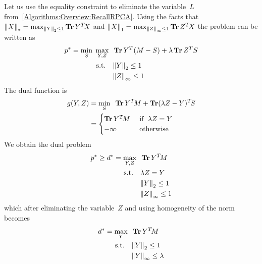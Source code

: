 \documentclass{../../common/projectreport}
\begin{document}
Let us use the equality constraint to eliminate the variable~$L$ from~\eqref{Algorithms:Overview:RecallRPCA}. Using the facts that ${\left\|X\right\|}_{*}^{} = \max_{{\left\|Y\right\|}_{2}^{}\leq 1} \operatorname{\mathbf{Tr}} Y^T\!X$ and ${\left\|X\right\|}_{1}^{} = \max_{{\left\|Z\right\|}_{\infty}^{}\leq 1} \operatorname{\mathbf{Tr}} Z^T\!X$  the problem can be written as
%
\begin{align}
\begin{split}
p^* = \min_S \;\max_{Y,Z} \;\; &\operatorname{\mathbf{Tr}} Y^T(M-S) + \lambda \operatorname{\mathbf{Tr}} Z^TS \\
\text{s.t.} \quad & {\left\|Y\right\|}_{2}^{}\leq 1 \\
&{\left\|Z\right\|}_{\infty}^{}\leq 1
\end{split}
\label{Algorithms:MainAlgs:IPM:SDPform:NoNorms}
\end{align}
%
The dual function is 
\begin{align}
\begin{split}
g(Y,Z) &= \min_S \;\; \operatorname{\mathbf{Tr}} Y^T\!M + \operatorname{\mathbf{Tr}} (\lambda Z-Y)^T\!S \\
&= \begin{cases}
\operatorname{\mathbf{Tr}} Y^T\!M  & \text{ if } \; \lambda Z = Y \\
-\infty & \text{ otherwise }
\end{cases} 
\end{split}
\label{Algorithms:MainAlgs:IPM:SDPform:DualFunct}
\end{align}
%
We obtain the dual problem 
\begin{align}
\begin{split}
p^* \geq d^* = \max_{Y,Z} \;\; &\operatorname{\mathbf{Tr}} Y^T\!M \\
\text{s.t.} \quad & \lambda Z = Y \\
&{\left\|Y\right\|}_{2}^{}\leq 1 \\
&{\left\|Z\right\|}_{\infty}^{}\leq 1
\end{split}
\label{Algorithms:MainAlgs:IPM:SDPform:DualProb}
\end{align}
%
which after eliminating the variable~$Z$ and using homogeneity of the norm becomes
\begin{align}
\begin{split}
d^* = \max_{Y} \;\; &\operatorname{\mathbf{Tr}} Y^T\!M \\
\text{s.t.} \quad & {\left\|Y\right\|}_{2}^{}\leq 1 \\
&{\left\|Y\right\|}_{\infty}^{}\leq \lambda
\end{split}
\label{Algorithms:MainAlgs:IPM:SDPform:DualSimpler}
\end{align}
\end{document}
